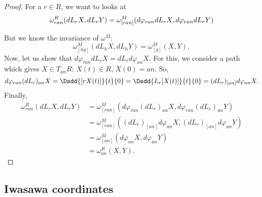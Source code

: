 \begin{proof}
For a $r\in R$, we want to looks at
\begin{equation}
\omega^R_{ran}(dL_rX,dL_rY)=\omega^M_{[ran]}(d\varphi_{ran}dL_rX,d\varphi_{ran}dL_rY)\\
\end{equation}

But we know the invariance of $\omega^M$:
\[
  \omega^M_{[hg]}(dL_hX,dL_hY)=\omega^M_{[g]}(X,Y),
\]
Now, let us show that $d\varphi_{ran}dL_rX=dL_rd\varphi_{an}X$. For this, we consider a path which gives $X\in T_{an}R$: $X(t)\in R$, $X(0)=an$. So,
\begin{equation}
  d\varphi_{ran}(dL_r)_{an}X=\Dsdd{[rX(t)]}{t}{0}
                        =\Dsdd{L_r[X(t)]}{t}{0}
			=(dL_r)_{[an]}d\varphi_{an}X.
\end{equation}
Finally,
\begin{equation}
\begin{split}
\omega_{ran}^R(dL_rX,dL_rY)&=\omega^M_{[ran]}(d\varphi_{ran}(dL_r)_{an}X,d\varphi_{ran}(dL_r)_{an}Y)\\
                           &=\omega^M_{[ran]}( (dL_r)_{[an]}d\varphi_{an}X,(dL_r)_{[an]}d\varphi_{an}Y )\\
			   &=\omega^M_{[an]}(d\varphi_{an}X,d\varphi_{an}Y)\\
			   &=\omega^R_{an}(X,Y).
\end{split}
\end{equation}

\end{proof}


\subsection{Iwasawa coordinates}

